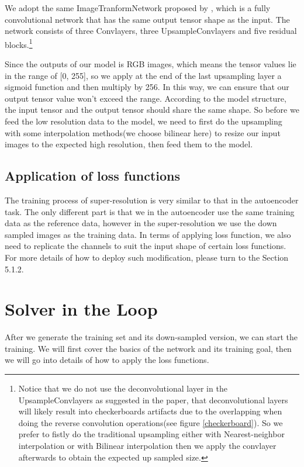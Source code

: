 \documentclass[a4paper,12pt,twoside]{report}
\begin{document}
We adopt the same ImageTranformNetwork proposed by \citeauthor{johnson2016perceptual}, which is a fully convolutional network that has the same output tensor shape as the input. The network consists of three Convlayers, three UpsampleConvlayers and five residual blocks.\footnote{Notice that we do not use the deconvolutional layer in the UpsampleConvlayers as suggested in the paper\cite{odena2016deconvolution}, that deconvolutional layers will likely result into checkerboards artifacts due to the overlapping when doing the reverse convolution operations(see figure \ref{checkerboard}). So we prefer to fistly do the traditional upsampling either with Nearest-neighbor interpolation or with Bilinear interpolation then we apply the convlayer afterwards to obtain the expected up sampled size.}

Since the outputs of our model is RGB images, which means the tensor values lie in the range of [0, 255], so we apply at the end of the last upsampling layer a sigmoid function and then multiply by 256. In this way, we can ensure that our output tensor value won't exceed the range. According to the model structure, the input tensor and the output tensor should share the same shape. So before we feed the low resolution data to the model, we need to first do the upsampling with some interpolation methods(we choose bilinear here) to resize our input images to the expected high resolution, then feed them to the model. 

\subsection{Application of loss functions}
The training process of super-resolution is very similar to that in the autoencoder task. The only different part is that we in the autoencoder use the same training data as the reference data, however in the super-resolution we use the down sampled images as the training data. In terms of applying loss function, we also need to replicate the channels to suit the input shape of certain loss functions. For more details of how to deploy such modification, please turn to the Section 5.1.2.


\section{Solver in the Loop}
After we generate the training set and its down-sampled version, we can start the training. We will first cover the basics of the network and its training goal, then we will go into details of how to apply the loss functions.
\end{document}
